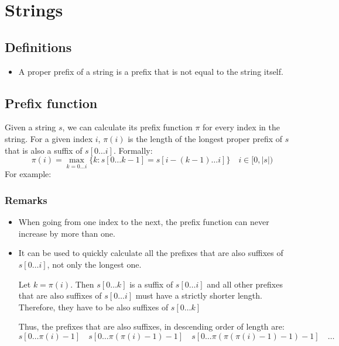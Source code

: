 \chapter{Strings}
\section{Definitions}
\begin{itemize}
		\item A proper prefix of a string is a prefix that is not
				equal to the string itself.
\end{itemize}
\section{Prefix function}
Given a string $s$, we can calculate its prefix function $\pi$ for
every index in the string. For a given index $i$, $\pi(i)$ is the 
length of the longest proper prefix of $s$ that is also a suffix of $s[0\dots i]$.
Formally:
\[
		\pi(i)=\max_{k=0\dots i} \big \{k : s[0\dots k-1] = 
		s[i-(k-1)\dots i]\big \} 
		\quad i\in\big[0,|s| \big)
\]
For example:
\begin{figure}[h!]
		\centering
\end{figure}

\subsection{Remarks}
\begin{itemize}
		\item When going from one index to the next, the prefix function can 
				never increase by more than one.
		\item It can be used to quickly calculate all the prefixes that are
				also suffixes of $s[0\dots i]$, not only the longest one.

				Let $k=\pi(i)$. Then $s[0\dots k]$ is a suffix of $s[0\dots i]$
				and all other prefixes that are also suffixes of $s[0\dots i]$ 
				must have a strictly shorter length. Therefore, they have to 
				be also suffixes of $s[0\dots k]$

				Thus, the prefixes that are also suffixes, in descending order
				of length are:
				\[
						s[0\dots \pi(i)-1] \quad
						s[0\dots \pi(\pi(i)-1)-1] \quad
						s[0\dots \pi(\pi(\pi(i)-1)-1)-1] \quad
						\dots
				\]
\end{itemize}
